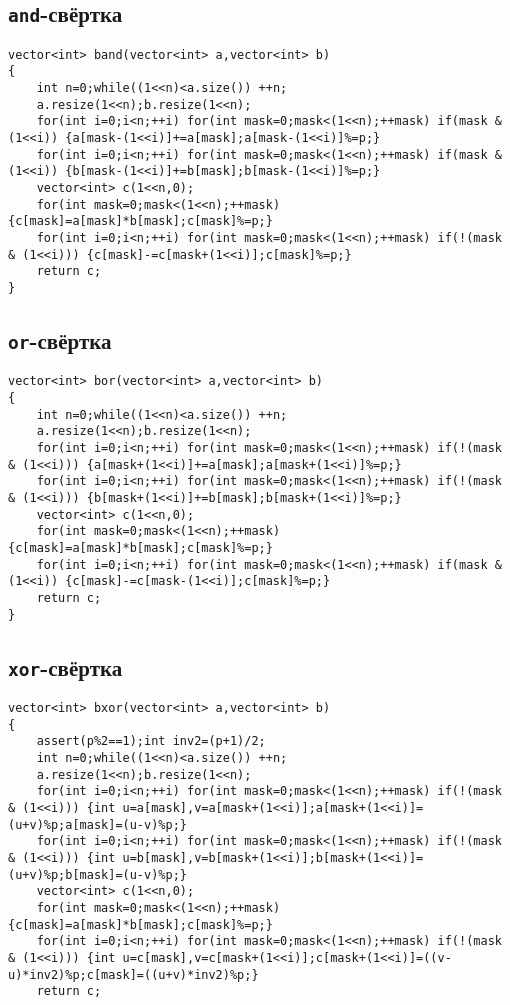\subsection{\texttt{and}-свёртка}
\begin{lstlisting}
vector<int> band(vector<int> a,vector<int> b)
{
    int n=0;while((1<<n)<a.size()) ++n;
    a.resize(1<<n);b.resize(1<<n);
    for(int i=0;i<n;++i) for(int mask=0;mask<(1<<n);++mask) if(mask & (1<<i)) {a[mask-(1<<i)]+=a[mask];a[mask-(1<<i)]%=p;}
    for(int i=0;i<n;++i) for(int mask=0;mask<(1<<n);++mask) if(mask & (1<<i)) {b[mask-(1<<i)]+=b[mask];b[mask-(1<<i)]%=p;}
    vector<int> c(1<<n,0);
    for(int mask=0;mask<(1<<n);++mask) {c[mask]=a[mask]*b[mask];c[mask]%=p;}
    for(int i=0;i<n;++i) for(int mask=0;mask<(1<<n);++mask) if(!(mask & (1<<i))) {c[mask]-=c[mask+(1<<i)];c[mask]%=p;}
    return c;
}
\end{lstlisting}
\subsection{\texttt{or}-свёртка}
\begin{lstlisting}
vector<int> bor(vector<int> a,vector<int> b)
{
    int n=0;while((1<<n)<a.size()) ++n;
    a.resize(1<<n);b.resize(1<<n);
    for(int i=0;i<n;++i) for(int mask=0;mask<(1<<n);++mask) if(!(mask & (1<<i))) {a[mask+(1<<i)]+=a[mask];a[mask+(1<<i)]%=p;}
    for(int i=0;i<n;++i) for(int mask=0;mask<(1<<n);++mask) if(!(mask & (1<<i))) {b[mask+(1<<i)]+=b[mask];b[mask+(1<<i)]%=p;}
    vector<int> c(1<<n,0);
    for(int mask=0;mask<(1<<n);++mask) {c[mask]=a[mask]*b[mask];c[mask]%=p;}
    for(int i=0;i<n;++i) for(int mask=0;mask<(1<<n);++mask) if(mask & (1<<i)) {c[mask]-=c[mask-(1<<i)];c[mask]%=p;}
    return c;
}
\end{lstlisting}
\subsection{\texttt{xor}-свёртка}
\begin{lstlisting}
vector<int> bxor(vector<int> a,vector<int> b)
{
    assert(p%2==1);int inv2=(p+1)/2;
    int n=0;while((1<<n)<a.size()) ++n;
    a.resize(1<<n);b.resize(1<<n);
    for(int i=0;i<n;++i) for(int mask=0;mask<(1<<n);++mask) if(!(mask & (1<<i))) {int u=a[mask],v=a[mask+(1<<i)];a[mask+(1<<i)]=(u+v)%p;a[mask]=(u-v)%p;}
    for(int i=0;i<n;++i) for(int mask=0;mask<(1<<n);++mask) if(!(mask & (1<<i))) {int u=b[mask],v=b[mask+(1<<i)];b[mask+(1<<i)]=(u+v)%p;b[mask]=(u-v)%p;}
    vector<int> c(1<<n,0);
    for(int mask=0;mask<(1<<n);++mask) {c[mask]=a[mask]*b[mask];c[mask]%=p;}
    for(int i=0;i<n;++i) for(int mask=0;mask<(1<<n);++mask) if(!(mask & (1<<i))) {int u=c[mask],v=c[mask+(1<<i)];c[mask+(1<<i)]=((v-u)*inv2)%p;c[mask]=((u+v)*inv2)%p;}
    return c;
\end{lstlisting}
